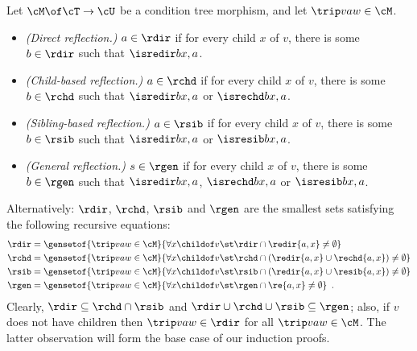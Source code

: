 \begin{definition}\label{def:syntactic reflection}
Let $\cM\of \cT\to\cU$ be a condition tree morphism, and let $\trip vaw\in\cM$.
\begin{itemize}[topsep=\smallskipamount]
\item \emph{(Direct reflection.)} $a\in\rdir$ if for every child $x$ of $v$, there is some $b\in\rdir$ such that $\isredir b{x,a}$.
\item \emph{(Child-based reflection.)} $a\in\rchd$ if for every child $x$ of $v$, there is some $b\in\rchd$ such that $\isredir b{x,a}$ or $\isrechd b{x,a}$.
\item \emph{(Sibling-based reflection.)} $a\in\rsib$ if for every child $x$ of $v$, there is some $b\in \rsib$ such that $\isredir b{x,a}$ or $\isresib b{x,a}$.
\item \emph{(General reflection.)} $s\in \rgen$ if for every child $x$ of $v$, there is some $b\in \rgen$ such that $\isredir b{x,a}$, $\isrechd b{x,a}$ or $\isresib b{x,a}$.
\end{itemize}
\end{definition}
%
Alternatively: $\rdir$, $\rchd$, $\rsib$ and $\rgen$ are the smallest sets satisfying the following recursive equations:
\begin{align*}
\rdir ={} & \gensetof{\trip vaw\in \cM}{\forall x\childof v\st \rdir \cap \redir{a,x}\neq\emptyset} \\
\rchd ={} &\gensetof{\trip vaw\in \cM}{\forall x\childof v\st \rchd \cap (\redir{a,x}\cup \rechd{a,x}) \neq\emptyset} \\
\rsib ={} &\gensetof{\trip vaw\in \cM}{\forall x\childof v\st \rsib \cap (\redir{a,x}\cup \resib{a,x}) \neq\emptyset} \\
\rgen ={} &\gensetof{\trip vaw\in \cM}{\forall x\childof v\st \rgen \cap \re{a,x} \neq\emptyset} \enspace.
\end{align*}
%
Clearly, $\rdir\subseteq \rchd\cap \rsib$ and $\rdir\cup \rchd \cup \rsib \subseteq \rgen$; also, if $v$ does not have children then $\trip vaw\in \rdir$ for all $\trip vaw\in\cM$. The latter observation will form the base case of our induction proofs.

